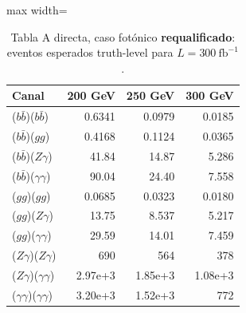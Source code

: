 %

\begin{table}[H]
\centering
\small
\caption{Tabla A directa, caso fot\'onico \textbf{requalificado}: eventos esperados truth-level para $L=300~\mathrm{fb}^{-1}$.}
\label{tab:A_fotonico_requal}
\begin{adjustbox}{max width=\textwidth}
\begin{tabular}{lrrr}
\toprule
Canal & 200 GeV & 250 GeV & 300 GeV \\
\midrule
($b\bar b$)($b\bar b$) & 0.6341 & 0.0979 & 0.0185 \\
($b\bar b$)($gg$) & 0.4168 & 0.1124 & 0.0365 \\
($b\bar b$)($Z\gamma$) & 41.84 & 14.87 & 5.286 \\
($b\bar b$)($\gamma\gamma$) & 90.04 & 24.40 & 7.558 \\
($gg$)($gg$) & 0.0685 & 0.0323 & 0.0180 \\
($gg$)($Z\gamma$) & 13.75 & 8.537 & 5.217 \\
($gg$)($\gamma\gamma$) & 29.59 & 14.01 & 7.459 \\
($Z\gamma$)($Z\gamma$) & 690 & 564 & 378 \\
($Z\gamma$)($\gamma\gamma$) & 2.97e+3 & 1.85e+3 & 1.08e+3 \\
($\gamma\gamma$)($\gamma\gamma$) & 3.20e+3 & 1.52e+3 & 772 \\
\bottomrule
\end{tabular}
\end{adjustbox}
\end{table}

